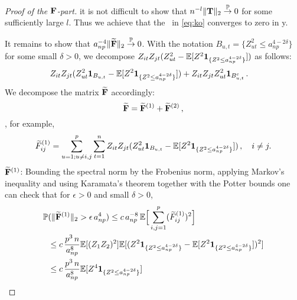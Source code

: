 \begin{proof}[Proof of the ${\mathbf F}$-part]
it is not difficult to show that $n^{-l} \|{\mathbf T}\|_2\stackrel{\mathbb{P}}{\rightarrow} 0$ for some sufficiently large $l$. Thus we achieve that the \rhs\
in \eqref{eq:ko} converges to zero in \pro y. 
\par
It remains to show that $a_{np}^{-4} \|\widetilde{{\mathbf F}}\|_2\stackrel{\mathbb{P}}{\rightarrow} 0$.
With the notation 
$B_{u,t}=\{Z_{ut}^2 \le a_{np}^{4-2\delta}  \} $
for some small $\delta>0$,
we decompose $Z_{it} Z_{jt} (Z_{ut}^2 - \mathbb{E}[Z^2 \mathbf{1}_{\{Z^2 \le a_{np}^{4-2\delta}\}}])$ as follows:
\begin{equation*}
\begin{split}
&Z_{it} Z_{jt} (Z_{ut}^2 \mathbf{1}_{B_{u,t}} - \mathbb{E}[Z^2 \mathbf{1}_{\{Z^2 \le a_{np}^{4-2\delta}\}}]) + Z_{it} Z_{jt} Z_{ut}^2 \mathbf{1}_{B_{u,t}^c}\,.
\end{split}
\end{equation*}
We decompose the matrix $\widetilde{{\mathbf F}}$ accordingly: 
\begin{equation*}
\widetilde{{\mathbf F}}= \widetilde{{\mathbf F}}^{(1)} + \widetilde{{\mathbf F}}^{(2)}\,,
\end{equation*}
\sth, for example, 
\begin{equation*}
\widetilde{F}^{(1)}_{ij} = \sum_{u=1;u\neq i,j}^p \sum_{t=1}^n  Z_{it} Z_{jt} (Z_{ut}^2 \mathbf{1}_{B_{u,t}} - \mathbb{E}[Z^2 \mathbf{1}_{\{Z^2 \le a_{np}^{4-2\delta}\}}])\,, \quad i \neq j.
\end{equation*} 
\noindent
$\widetilde{{\mathbf F}}^{(1)}$: 
Bounding the spectral norm by the Frobenius norm, applying Markov's inequality and using Karamata's theorem together with the Potter bounds one can check that for $\epsilon>0$ and small $\delta>0$,
\begin{equation*}
\begin{split}
\P&(\twonorm{\widetilde{\bfF}^{(1)}}> \epsilon\, a_{np}^4) \le c\, a_{np}^{-8}\, \E \Big[ \sum_{i,j=1}^p (\widetilde{F}^{(1)}_{ij})^2  \Big]\\
&\le  c \,\frac{p^3\, n}{a_{np}^{8}}\E[(Z_1Z_2)^2 ] \E[(Z^2 \1_{\{Z^2 \le a_{np}^{4-2\delta}\}} - \E[Z^2 \1_{\{Z^2 \le a_{np}^{4-2\delta}\}}])^2 ]\\
&\le c \,\frac{p^3\, n}{a_{np}^{8}} \E[Z^4 \1_{\{Z^2 \le a_{np}^{4-2\delta}\}}] \\

\end{split}
\end{equation*}
\end{proof}
